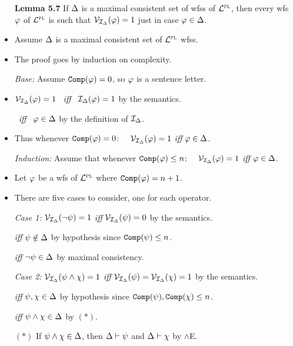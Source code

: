 \documentclass[a4paper, 11pt]{article} %
\begin{document}
\begin{itemize}
  \item[\bf Lemma 5.7] If $\Delta$ is a maximal consistent set of wfss of $\mathcal{L}^{\textsc{pl}}$, then every wfs $\varphi$ of $\mathcal{L}^{\textsc{pl}}$ is such that $\mathcal{V}_{\mathcal{I}_{\Delta}}(\varphi) = 1$ just in case $\varphi\in\Delta$.  
    \item Assume $\Delta$ is a maximal consistent set of $\mathcal{L}^{\textsc{pl}}$ wfss.
    \item The proof goes by induction on complexity.
    \item[\it Base:] Assume $\texttt{Comp}(\varphi)=0$, so $\varphi$ is a sentence letter.
      \item $\mathcal{V}_{\mathcal{I}_{\Delta}}(\varphi)=1$ ~\textit{iff}~ $\mathcal{I}_{\Delta}(\varphi) = 1$ by the semantics.
      \item[] \hspace{.75in} ~\textit{iff}~ $\varphi \in \Delta$ by the definition of $\mathcal{I}_{\Delta}$.
      \item Thus whenever $\texttt{Comp}(\varphi) = 0$:~~ $\mathcal{V}_{\mathcal{I}_{\Delta}}(\varphi) = 1$ \textit{iff} $\varphi\in\Delta$.
    \item[\it Induction:] Assume that whenever $\texttt{Comp}(\varphi)\leq n$:~~ $\mathcal{V}_{\mathcal{I}_\Delta}(\varphi)=1$ \textit{iff} $\varphi\in\Delta$.
    \item Let $\varphi$ be a wfs of $\mathcal{L}^{\textsc{pl}}$ where $\texttt{Comp}(\varphi)=n+1$.
    \item There are five cases to consider, one for each operator.
    \item[\it Case 1:] $\mathcal{V}_{\mathcal{I}_\Delta}(\neg\psi)=1$ \textit{iff} $\mathcal{V}_{\mathcal{I}_\Delta}(\psi) = 0$ by the semantics. 
      \item[] \hspace{.86in} \textit{iff} $\psi\notin\Delta$ by hypothesis since $\texttt{Comp}(\psi) \leq n$.
      \item[] \hspace{.86in} \textit{iff} $\neg\psi\in\Delta$ by maximal consistency.
    \item[\it Case 2:] $\mathcal{V}_{\mathcal{I}_\Delta}(\psi\wedge\chi)=1$ \textit{iff} $\mathcal{V}_{\mathcal{I}_\Delta}(\psi)=\mathcal{V}_{\mathcal{I}_\Delta}(\chi)=1$ by the semantics.     
      \item[] \hspace{1.02in} \textit{iff} $\psi,\chi\in\Delta$ by hypothesis since $\texttt{Comp}(\psi), \texttt{Comp}(\chi) \leq n$.
      \item[] \hspace{1.02in} \textit{iff} $\psi\wedge\chi\in\Delta$ by $(*)$.
      \item[$(*)$] If $\psi\wedge\chi\in\Delta$, then $\Delta \vdash \psi$ and $\Delta \vdash \chi$ by $\wedge$E. 

\end{itemize}
\end{document}
